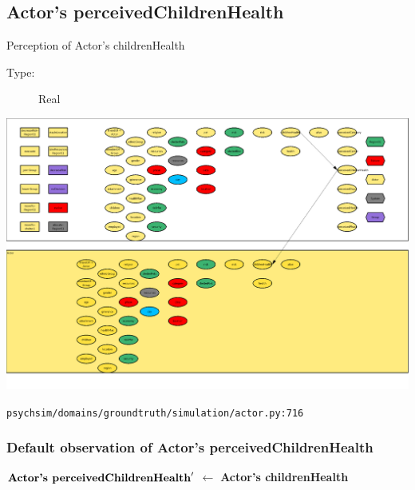 \documentclass{article}%
\begin{document}
%
\subsection{Actor's perceivedChildrenHealth}%
\label{subsec:Actor's perceivedChildrenHealth}%
Perception of Actor's childrenHealth%
\begin{description}%
\item[Type:]%
Real%
\end{description}%
\includegraphics[width=\textwidth]{images/perceivedChildrenHealthOfActor.png}%
\begin{flushleft}%
\verb|psychsim/domains/groundtruth/simulation/actor.py:716|%
\end{flushleft}%
\subsubsection{Default observation of Actor's perceivedChildrenHealth}%
\label{ssubsec:Default observation of Actor's perceivedChildrenHealth}%
\begin{flushleft}%
$\mbox{\textbf{Actor's perceivedChildrenHealth}} '$%
$\leftarrow$%
\textbf{Actor's childrenHealth}%
\end{flushleft}

%
\end{document}
